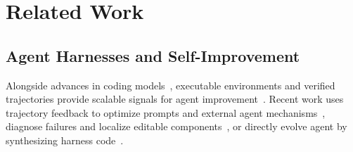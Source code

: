 \documentclass{article} %
\begin{document}



\section{Related Work}

\subsection{Agent Harnesses and Self-Improvement}

Alongside advances in coding models~\citep{yang2026iquestcoderv1technicalreport,yang-etal-2026-loopcoder}, executable environments and verified trajectories provide scalable signals for agent improvement~\citep{wu2026large,gandhi2026endless,cheng2026terminal}.
Recent work uses trajectory feedback to optimize prompts and external agent mechanisms~\citep{agrawal2026gepa,zhang2026rewardharness,fan2026medclaw}, diagnose failures and localize editable components~\citep{lin2026agentic,chen2026failed}, or directly evolve agent by synthesizing harness code~\citep{zhang2026darwin,lou2026autoharness,lee2026meta,ren2026selfevolvingframeworkefficientterminal}.
\end{document}
